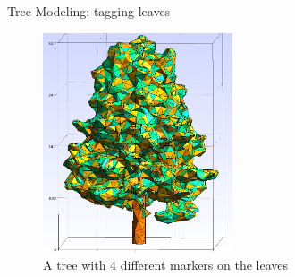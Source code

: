 \documentclass[10pt]{beamer}
\begin{document}
\begin{frame}{Tree Modeling: tagging leaves}
	\begin{figure}
		\centering
		\includegraphics[width=0.5\textwidth]{images/ginkgo_tagged.png}
		\caption{A tree with 4 different markers on the leaves}
		\label{fig:figure1}
	\end{figure}
\end{frame}
\end{document}
